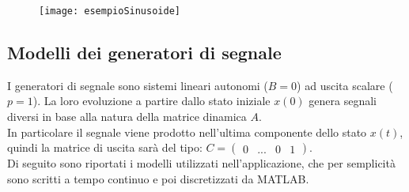 \begin{figure}[h]
	\centering
	\texttt{[image: esempioSinusoide]}
\end{figure}

\newpage

\subsection{Modelli dei generatori di segnale}
I generatori di segnale sono sistemi lineari autonomi ($B=0$) ad uscita scalare ($p=1$). La loro evoluzione a partire dallo stato iniziale $x(0)$ genera segnali diversi in base alla natura della matrice dinamica $A$.\\
In particolare il segnale viene prodotto nell'ultima componente dello stato $x(t)$, quindi la matrice di uscita sarà del tipo: $C=\begin{pmatrix}0 & ... & 0 & 1\end{pmatrix}$.\\
Di seguito sono riportati i modelli utilizzati nell'applicazione, che per semplicità sono scritti a tempo continuo e poi discretizzati da MATLAB.
